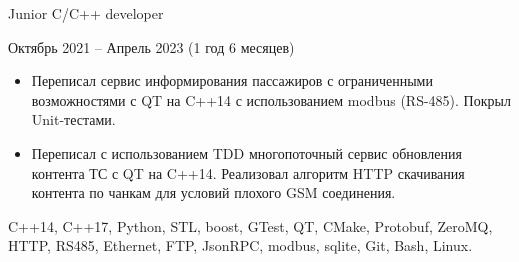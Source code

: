 {    %

    \cvexperiencePosition
            {Junior C/C++ developer}

    \cvexperiencePeriod
        {Октябрь 2021 -- Апрель 2023 (1 год 6 месяцев)}

    \smallskip
    \begin{itemize}

        \item
            Переписал сервис информирования пассажиров с ограниченными возможностями
            с QT на C++14 с использованием modbus (RS-485). Покрыл Unit-тестами.

        \item
            Переписал с использованием TDD многопоточный сервис обновления контента ТС с QT на
            C++14. Реализовал алгоритм HTTP скачивания контента по чанкам для условий плохого GSM
            соединения.

    \end{itemize}


    \funcExperienceTechnology
    {
        C++14, C++17, Python,                                           %
        STL, boost, GTest, QT,                                          %
        CMake,                                                          %
        Protobuf, ZeroMQ, HTTP, RS485, Ethernet, FTP, JsonRPC, modbus,  %
        sqlite,
        Git,                                                            %
        Bash, Linux.                                                    %
    }
}



